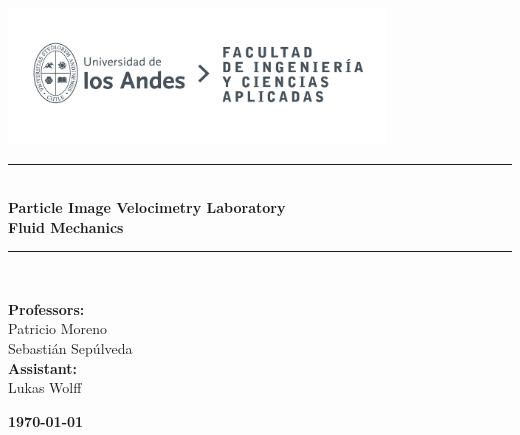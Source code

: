 \documentclass{article} %
\begin{document}
\begin{titlepage}%
\newcommand{\HRule}{\rule{\linewidth}{0.5mm}} 
\center 
\includegraphics[width=10cm]{LOGO_UNIVERSIDAD.jpg}\\ %
\vspace{3cm}
\HRule \\[0.4cm]
{ \huge \bfseries Particle Image Velocimetry Laboratory}\\[0.4cm] %
{ \huge \bfseries Fluid Mechanics}\\[0.4cm] %
\HRule \\[1.5cm]
 \vspace{5cm}
\begin{flushright}
    { \textbf{Professors:}\\
    Patricio Moreno\\
    Sebastián Sepúlveda\\
    \vspace{0.2cm}
    \textbf{Assistant:}\\
    Lukas Wolff\\
    \vspace{0.4cm}
}
\end{flushright}
\vspace{1cm}
{\large \textbf{\today}}\\[2cm] %
\end{titlepage}
\end{document}
